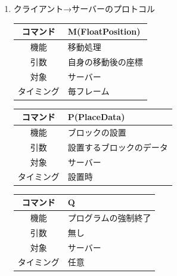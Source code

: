 \documentclass{jarticle}
\begin{document}
\begin{enumerate}
    \item クライアント→サーバーのプロトコル
    \begin{table}[H]
        \label{table:command2-1}
        \begin{center}
            \begin{tabular}{|c||p{30em}|}\hline
                コマンド&M(FloatPosition)\\\hline
                機能&移動処理\\
                引数&自身の移動後の座標\\
                対象&サーバー\\
                タイミング&毎フレーム\\\hline
            \end{tabular}
        \end{center}
    \end{table}
    \begin{table}[H]
        \label{table:command2-2}
        \begin{center}
            \begin{tabular}{|c||p{30em}|}\hline
                コマンド&P(PlaceData)\\\hline
                機能&ブロックの設置\\
                引数&設置するブロックのデータ\\
                対象&サーバー\\
                タイミング&設置時\\\hline
            \end{tabular}
        \end{center}
    \end{table}
    \begin{table}[H]
        \label{table:command2-3}
        \begin{center}
            \begin{tabular}{|c||p{30em}|}\hline
                コマンド&Q\\\hline
                機能&プログラムの強制終了\\
                引数&無し\\
                対象&サーバー\\
                タイミング&任意\\\hline
            \end{tabular}
        \end{center}
    \end{table}
\end{enumerate}
\end{document}
